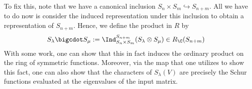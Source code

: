\documentclass[../main.tex]{subfiles}
\begin{document}
To fix this, note that we have a canonical inclusion $ S_{n}\times S_{m}\hookrightarrow S_{n+m} $. All we have to do now is consider the induced representation under this inclusion to obtain a representation of $ S_{n+m} $. Hence, we define the product in $ R $ by 
\[
  S_{\lambda}\bigcdot S_{\mu} := \Ind_{S_{n}\times S_{m}}^{S_{n+m}} (S_{\lambda}\otimes S_{\mu}) \in R_{\C}(S_{n+m})
\]
With some work, one can show that this in fact induces the ordinary product on the ring of symmetric functions. Moreover, via the map that one utilizes to show this fact, one can also show that the characters of $ S_{\lambda}(V) $ are precisely the Schur functions evaluated at the eigenvalues of the input matrix.
\end{document}
